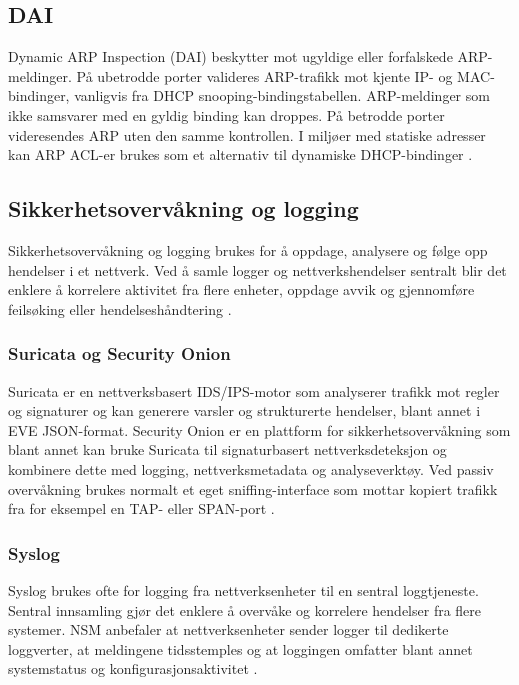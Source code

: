 \subsection{DAI}

Dynamic ARP Inspection (DAI) beskytter mot ugyldige eller forfalskede ARP-meldinger. På ubetrodde porter valideres ARP-trafikk mot kjente IP- og MAC-bindinger, vanligvis fra DHCP snooping-bindingstabellen. ARP-meldinger som ikke samsvarer med en gyldig binding kan droppes. På betrodde porter videresendes ARP uten den samme kontrollen. I miljøer med statiske adresser kan ARP ACL-er brukes som et alternativ til dynamiske DHCP-bindinger \cite{forsvaret_nettverk_rolle1}.

\subsection{Sikkerhetsovervåkning og logging}

Sikkerhetsovervåkning og logging brukes for å oppdage, analysere og følge opp hendelser i et nettverk. Ved å samle logger og nettverkshendelser sentralt blir det enklere å korrelere aktivitet fra flere enheter, oppdage avvik og gjennomføre feilsøking eller hendelseshåndtering \cite{nsm_n03}.

\subsubsection{Suricata og Security Onion}

Suricata er en nettverksbasert IDS/IPS-motor som analyserer trafikk mot regler og signaturer og kan generere varsler og strukturerte hendelser, blant annet i EVE JSON-format. Security Onion er en plattform for sikkerhetsovervåkning som blant annet kan bruke Suricata til signaturbasert nettverksdeteksjon og kombinere dette med logging, nettverksmetadata og analyseverktøy. Ved passiv overvåkning brukes normalt et eget sniffing-interface som mottar kopiert trafikk fra for eksempel en TAP- eller SPAN-port \cite{suricata_eve,security_onion_intro}.

\subsubsection{Syslog}

Syslog brukes ofte for logging fra nettverksenheter til en sentral loggtjeneste. Sentral innsamling gjør det enklere å overvåke og korrelere hendelser fra flere systemer. NSM anbefaler at nettverksenheter sender logger til dedikerte loggverter, at meldingene tidsstemples og at loggingen omfatter blant annet systemstatus og konfigurasjonsaktivitet \cite{nsm_n03}.

